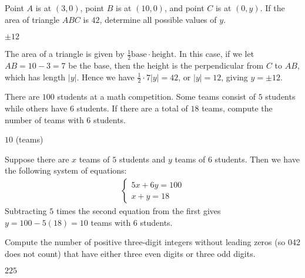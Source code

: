 \documentclass[11pt]{article}
\begin{document}
\begin{problem}
Point $A$ is at $(3, 0)$, point $B$ is at $(10, 0)$, and point $C$ is at $(0, y)$.
If the area of triangle $ABC$ is $42$, determine all possible values of $y$.
\end{problem}

\begin{answer}
$\boxed{\pm 12}$
\end{answer}

\begin{solution}
The area of a triangle is given by $\frac{1}{2} \text{base} \cdot \text{height}$.
In this case, if we let $AB = 10-3 = 7$ be the base, then the height is the perpendicular
from $C$ to $AB$, which has length $|y|$. Hence we have $\frac{1}{2}\cdot 7|y| = 42$,
or $|y| = 12$, giving $y = \boxed{\pm 12}$.
\end{solution}


\begin{problem}
There are $100$ students at a math competition. Some teams consist of $5$ students while others have $6$
students. If there are a total of $18$ teams, compute the number of teams with $6$ students.
\end{problem}

\begin{answer}
$\boxed{10}$ (teams)
\end{answer}

\begin{solution}
Suppose there are $x$ teams of $5$ students and $y$ teams of $6$ students. Then we have the
following system of equations:
\begin{align*}
\begin{cases}
5x + 6y = 100 \\
x + y = 18
\end{cases}
\end{align*}
Subtracting $5$ times the second equation from the first gives $y = 100 -  5(18) = \boxed{10}$ 
teams with $6$ students.
\end{solution}


\begin{problem}%
Compute the number of positive three-digit integers without leading zeros (so 042 does not count) that
have either three even digits or three odd digits.
\end{problem}

\begin{answer}
$\boxed{225}$
\end{answer}
\end{document}
